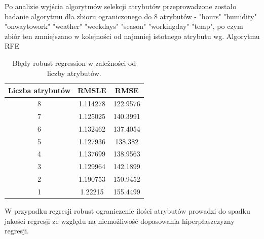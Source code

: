 \documentclass[a4paper,12pt]{article}
\begin{document}
Po analizie wyjścia algorytmów selekcji atrybutów przeprowadzone zostało badanie algorytmu dla zbioru ograniczonego do 8 atrybutów - "hours"    "humidity"  "onwaytowork" "weather" "weekdays"  "season" "workingday"  "temp", po czym zbiór ten zmniejszano w kolejności od najmniej istotnego atrybutu wg. Algorytmu RFE
    
    \begin{table}
        \begin{tabular}{|c|c|c|}
                \hline
                Liczba atrybutów & RMSLE & RMSE \\
                \hline
                8 & 1.114278 & 122.9576 \\
                \hline
                7 & 1.125025 & 140.3991 \\
                \hline
                6 & 1.132462 & 137.4054 \\
                \hline
                5 & 1.127936 & 138.382 \\
                \hline
                4 & 1.137699 & 138.9563 \\
                \hline
                3 & 1.129964 & 142.1899 \\
                \hline
                2 & 1.190753 & 150.9452 \\
                \hline
                1 & 1.22215 & 155.4499 \\
                \hline
        \end{tabular}
        \caption{Błędy robust regression w zależności od liczby atrybutów.}
    \end{table}
    
    W przypadku regresji robust ograniczenie ilości atrybutów prowadzi do spadku jakości regresji ze względu na niemożliwość dopasowania hiperpłaszczyzny regresji.
    
\end{document}
